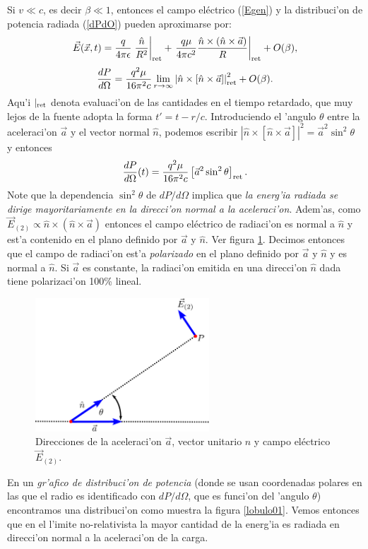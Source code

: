 Si $v\ll c$, es decir $\beta\ll1$, entonces el campo eléctrico
(\ref{Egen}) y la distribuci'on de potencia radiada (\ref{dPdO}) pueden
aproximarse por:
\begin{equation}
\vec{E}(\vec{x},t)=\frac{q}{4\pi\epsilon}\left.\frac{\hat{n}}{R^2}\right|_{\rm ret}+\left.
\frac{q\mu}{4\pi c^2}\frac{\hat{n}\times(\hat{n}\times{\vec{a}})}{R}\right|_{\rm
ret} +O(\beta),
\end{equation}
\begin{equation}
\frac{dP}{d\Omega}=\frac{q^2\mu}{16\pi^2c}\lim_{r\rightarrow\infty}
\left|\hat{n}\times\left[
\hat{n}\times{\vec{a}}\right]\right|^2_{\rm ret}  +O(\beta).
\end{equation}
Aqu'i $|_{\rm ret}$ denota evaluaci'on de las cantidades en el tiempo retardado, que muy lejos de la fuente adopta la forma $t'=t-r/c$.
Introduciendo el 'angulo $\theta$ entre la aceleraci'on $\vec{a}$ y el vector
normal $\hat{n}$, podemos escribir
$\left|\hat{n}\times\left[\hat{n}\times{\vec{a}}\right]\right|^2=\vec{a}^2\sin^2\theta$ y entonces
\begin{equation}
\frac{dP}{d\Omega}(t)=\frac{q^2\mu}{16\pi^2 c}\left[ \vec{a}^2\sin^2\theta\right]_{\rm
ret} .\label{Lardif}
\end{equation}
 Note que la dependencia $\sin^2\theta$ de ${dP}/{d\Omega}$ implica que \textit{la energ'ia radiada se dirige mayoritariamente en la direcci'on normal a la aceleraci'on}. Adem'as, como $\vec{E}_{(2)}\propto \hat{n}\times(\hat{n}\times{\vec{a}})$ entonces el campo eléctrico de radiaci'on  es normal a $\hat{n}$ y est'a contenido en el plano definido por $\vec{a}$ y $\hat{n}$. Ver figura \ref{fig:natheta}. Decimos entonces que el campo de radiaci'on est'a
\textit{polarizado} en el plano definido por $\vec{a}$ y $\hat{n}$ y es normal a $\hat{n}$. Si $\vec{a}$ es constante, la radiaci'on emitida en una direcci'on $\hat{n}$ dada tiene polarizaci'on 100\% lineal.
\begin{figure}[!h]
\centerline{\includegraphics[height=5cm]{fig/fig-a-n-Erad.pdf}}
\caption{Direcciones de la aceleraci'on $\vec{a}$, vector unitario $\hat{n}$ y campo eléctrico $\vec{E}_{(2)}$.}
\label{fig:natheta}
\end{figure}
En un \textit{gr'afico de distribuci'on de potencia} (donde se usan coordenadas polares en las que el radio es identificado con ${dP}/{d\Omega}$, que es funci'on del 'angulo $\theta$) encontramos una distribuci'on como muestra la figura \ref{lobulo01}. Vemos entonces que en el l'imite no-relativista la mayor cantidad de la energ'ia es radiada en direcci'on normal a la aceleraci'on de la carga.


